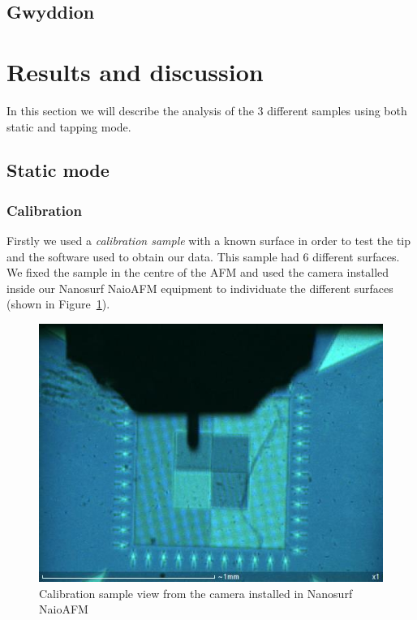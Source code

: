 \documentclass[11pt,a4paper]{article}
\begin{document}
\subsection{Gwyddion}


\section{Results and discussion}
In this section we will describe the analysis of the 3 different samples using both static and tapping mode.
\subsection{Static mode}

\subsubsection{Calibration}
Firstly we used a \emph{calibration sample} with a known surface in order to test the tip and the software used to obtain our data. This sample had 6 different surfaces. We fixed the sample in the centre of the AFM and used the camera installed inside our Nanosurf NaioAFM equipment to individuate the different surfaces (shown in Figure~\ref{fig:cal_sam}).
\begin{figure}[ht]
\begin{center}
\includegraphics[scale=0.4]{calibration_sample.JPG}
\caption{Calibration sample view from the camera installed in Nanosurf NaioAFM}\label{fig:cal_sam}
\end{center}
\end{figure}
\end{document}
